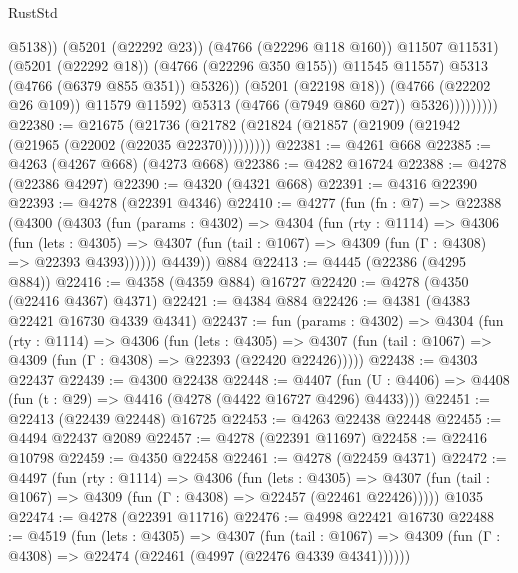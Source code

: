 \begin{lexlean}{RustStd}
\begin{coremodule}
{\begin{coremodule}
{{{{{{{{{{{{{{{{{{{{{{{{{{{{{{{{{{{                                    @5138))
                                (@5201 (@22292 @23))
                                (@4766 (@22296 @118 @160))
                                @11507
                                @11531)
                              (@5201 (@22292 @18))
                              (@4766 (@22296 @350 @155))
                              @11545
                              @11557)
                            @5313
                            (@4766 (@6379 @855 @351))
                            @5326))
                        (@5201 (@22198 @18))
                        (@4766 (@22202 @26 @109))
                        @11579
                        @11592)
                      @5313
                      (@4766 (@7949 @860 @27))
                      @5326)))))))))
@22380 := @21675
    (@21736 (@21782 (@21824 (@21857 (@21909 (@21942 (@21965 (@22002 (@22035 @22370)))))))))
@22381 := @4261 @668
@22385 := @4263 (@4267 @668) (@4273 @668)
@22386 := @4282 @16724
@22388 := @4278 (@22386 @4297)
@22390 := @4320 (@4321 @668)
@22391 := @4316 @22390
@22393 := @4278 (@22391 @4346)
@22410 := @4277
    (fun (fn : @7) =>
    @22388
      (@4300
        (@4303
          (fun (params : @4302) =>
          @4304
            (fun (rty : @1114) =>
            @4306
              (fun (lets : @4305) =>
              @4307 (fun (tail : @1067) => @4309 (fun (Γ : @4308) => @22393 @4393))))))
        @4439))
    @884
@22413 := @4445 (@22386 (@4295 @884))
@22416 := @4358 (@4359 @884) @16727
@22420 := @4278 (@4350 (@22416 @4367) @4371)
@22421 := @4384 @884
@22426 := @4381 (@4383 @22421 @16730 @4339 @4341)
@22437 := fun (params : @4302) =>
  @4304
    (fun (rty : @1114) =>
    @4306
      (fun (lets : @4305) =>
      @4307 (fun (tail : @1067) => @4309 (fun (Γ : @4308) => @22393 (@22420 @22426)))))
@22438 := @4303 @22437
@22439 := @4300 @22438
@22448 := @4407
    (fun (U : @4406) => @4408 (fun (t : @29) => @4416 (@4278 (@4422 @16727 @4296) @4433)))
@22451 := @22413 (@22439 @22448) @16725
@22453 := @4263 @22438 @22448
@22455 := @4494 @22437 @2089
@22457 := @4278 (@22391 @11697)
@22458 := @22416 @10798
@22459 := @4350 @22458
@22461 := @4278 (@22459 @4371)
@22472 := @4497
    (fun (rty : @1114) =>
    @4306
      (fun (lets : @4305) =>
      @4307 (fun (tail : @1067) => @4309 (fun (Γ : @4308) => @22457 (@22461 @22426)))))
    @1035
@22474 := @4278 (@22391 @11716)
@22476 := @4998 @22421 @16730
@22488 := @4519
    (fun (lets : @4305) =>
    @4307
      (fun (tail : @1067) =>
      @4309 (fun (Γ : @4308) => @22474 (@22461 (@4997 (@22476 @4339 @4341))))))
}}}}}}}}}}}}}}}}}}}}}}}}}}}}}}}}}}}
\end{coremodule}}
\end{coremodule}
\end{lexlean}
